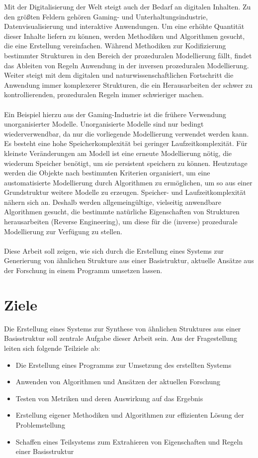 Mit der Digitalisierung der Welt steigt auch der Bedarf an digitalen Inhalten.
Zu den größten Feldern gehören Gaming- und Unterhaltungsindustrie, Datenvisualisierung und interaktive Anwendungen.
Um eine erhöhte Quantität dieser Inhalte liefern zu können, werden Methodiken und Algorithmen gesucht, die eine Erstellung
vereinfachen.
Während Methodiken zur Kodifizierung bestimmter Strukturen in den Bereich der prozeduralen Modellierung fällt,
findet das Ableiten von Regeln Anwendung in der inversen prozeduralen Modellierung.
Weiter steigt mit dem digitalen und naturwissenschaftlichen Fortschritt die Anwendung immer komplexerer Strukturen, die
ein Herausarbeiten der schwer zu kontrollierenden, prozeduralen Regeln immer schwieriger machen.
\\~\\
Ein Beispiel hierzu aus der Gaming-Industrie ist die frühere Verwendung unorganisierter Modelle.
Unorganisierte Modelle sind nur bedingt wiederverwendbar, da nur die vorliegende Modellierung verwendet werden kann.
Es besteht eine hohe Speicherkomplexität bei geringer Laufzeitkomplexität.
Für kleinste Veränderungen am Modell ist eine erneute Modellierung nötig, die wiederum Speicher benötigt, um sie
persistent speichern zu können.
Heutzutage werden die Objekte nach bestimmten Kriterien organisiert, um eine austomatisierte Modellierung durch Algorithmen
zu ermöglichen, um so aus einer Grundstruktur weitere Modelle zu erzeugen.
Speicher- und Laufzeitkomplexität nähern sich an.
Deshalb werden allgemeingültige, vielseitig anwendbare Algorithmen gesucht, die bestimmte natürliche Eigenschaften
von Strukturen herausarbeiten (Reverse Engineering), um diese für die (inverse) prozedurale Modellierung zur
Verfügung zu stellen.
\\~\\
Diese Arbeit soll zeigen, wie sich durch die Erstellung eines Systems zur Generierung von ähnlichen Strukture aus einer
Basistruktur, aktuelle Ansätze aus der Forschung in einem Programm umsetzen lassen.

\newpage

\section{Ziele}

Die Erstellung eines Systems zur Synthese von ähnlichen Struktures aus einer Basisstruktur soll zentrale Aufgabe dieser
Arbeit sein.
Aus der Fragestellung leiten sich folgende Teilziele ab:

\begin{itemize}
    \item Die Erstellung eines Programms zur Umsetzung des erstellten Systems
    \item Anwenden von Algorithmen und Ansätzen der aktuellen Forschung
    \item Testen von Metriken und deren Auswirkung auf das Ergebnis
    \item Erstellung eigener Methodiken und Algorithmen zur effizienten Lösung der Problemstellung
    \item Schaffen eines Teilsystems zum Extrahieren von Eigenschaften und Regeln einer Basisstruktur
\end{itemize}


